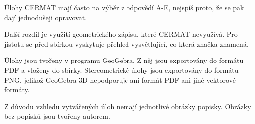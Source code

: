 Úlohy CERMAT mají často na výběr z odpovědí A-E, nejspíš proto, že se pak dají jednodušeji opravovat.

Další rozdíl je využití geometrického zápisu, které CERMAT nevyužívá. Pro jistotu se před sbírkou vyskytuje přehled vysvětlující, co která značka znamená.

Úlohy jsou tvořeny v programu GeoGebra. Z něj jsou exportovány do formátu PDF a vloženy do sbírky. Stereometrické úlohy jsou exportovány do formátu PNG, jelikož GeoGebra 3D nepodporuje ani formát PDF ani jiné vektorové formáty.

Z důvodu vzhledu vytvářených úloh nemají jednotlivé obrázky popisky. Obrázky bez popisků jsou tvořeny autorem.
